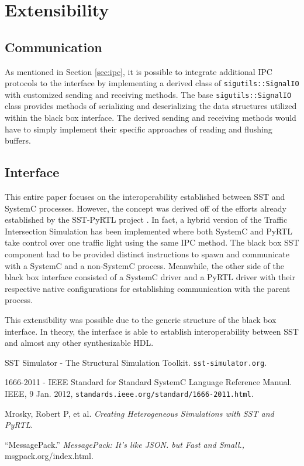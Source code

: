\documentclass{article}
\begin{document}
  \section{Extensibility}

    \subsection{Communication}
    As mentioned in Section \ref{sec:ipc}, it is possible to integrate additional IPC protocols to
    the interface by implementing a derived class of \lstinline{sigutils::SignalIO} with customized
    sending and receiving methods. The base \lstinline{sigutils::SignalIO} class provides methods of
    serializing and deserializing the data structures utilized within the black box interface. The
    derived sending and receiving methods would have to simply implement their specific approaches
    of reading and flushing buffers.

    \subsection{Interface}

    This entire paper focuses on the interoperability established between SST and SystemC processes.
    However, the concept was derived off of the efforts already established by the SST-PyRTL project
    \cite{pyrtl-sst}. In fact, a hybrid version of the Traffic Intersection Simulation has been
    implemented where both SystemC and PyRTL take control over one traffic light using the same IPC
    method. The black box SST component had to be provided distinct instructions to spawn and
    communicate with a SystemC and a non-SystemC process. Meanwhile, the other side of the black box
    interface consisted of a SystemC driver and a PyRTL driver with their respective native
    configurations for establishing communication with the parent process.

    This extensibility was possible due to the generic structure of the black box interface. In
    theory, the interface is able to establish interoperability between SST and almost any other
    synthesizable HDL.


  \begin{thebibliography}{5}

     SST Simulator - The Structural Simulation Toolkit. \texttt{sst-simulator.org}.

     1666-2011 - IEEE Standard for Standard SystemC Language Reference Manual. IEEE, 9
    Jan. 2012, \texttt{standards.ieee.org/standard/1666-2011.html}.

     Mrosky, Robert P, et al.
    \textit{Creating Heterogeneous Simulations with SST and PyRTL}.

     ``MessagePack.'' \textit{MessagePack: It's like JSON. but Fast and Small.,}
    msgpack.org/index.html.

  \end{thebibliography}
\end{document}
